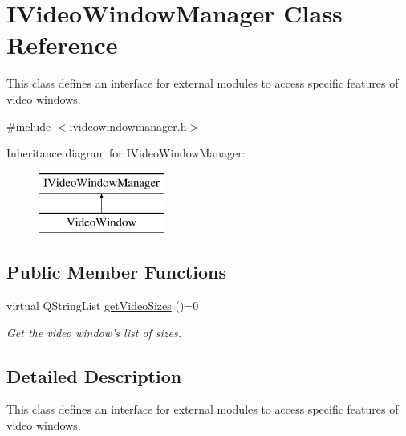 \hypertarget{classIVideoWindowManager}{\section{I\-Video\-Window\-Manager Class Reference}
\label{classIVideoWindowManager}
}


This class defines an interface for external modules to access specific features of video windows.  




{\ttfamily \#include $<$ivideowindowmanager.\-h$>$}

Inheritance diagram for I\-Video\-Window\-Manager\-:\begin{figure}[H]
\begin{center}
\leavevmode
\includegraphics[height=2.000000cm]{classIVideoWindowManager}
\end{center}
\end{figure}
\subsection*{Public Member Functions}
\begin{DoxyCompactItemize}
\item 
virtual Q\-String\-List \hyperlink{classIVideoWindowManager_a40fe14abdb6a7ffba05841ac9be08179}{get\-Video\-Sizes} ()=0
\begin{DoxyCompactList}\small\item\em Get the video window's list of sizes. \end{DoxyCompactList}\end{DoxyCompactItemize}


\subsection{Detailed Description}
This class defines an interface for external modules to access specific features of video windows. 

